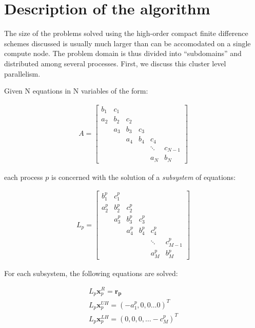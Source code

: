 \documentclass{article}
\begin{document}
\section{Description of the algorithm}

    The size of the problems solved using the high-order compact finite
    difference schemes discussed is usually much larger than can be accomodated
    on a single compute node.
    The problem domain is thus divided into ``subdomains'' and distributed among
    several processes.
    First, we discuss this cluster level parallelism.

    Given N equations in N variables of the form:

    \begin{align}
    & A =
     \begin{bmatrix}
         b_1 & c_1 \\
         a_2 & b_2 & c_2 \\
             & a_3 & b_3 & c_3 \\
             &     & a_4 & b_4 & c_4 \\
             &     &     &     &  \ddots & c_{N-1}\\
             &     &     &     &     a_N  & b_N
      \end{bmatrix}&
    \end{align}

    each process $p$ is concerned with the solution of a \emph{subsystem}
    of equations:

    \begin{align}
    &L_p =
    \begin{bmatrix}
        b_1^p & c_1^p \\
        a_2^p & b_2^p & c_2^p \\
              & a_3^p & b_3^p & c_3^p \\
              &       & a_4^p & b_4^p & c_4^p \\
              &       &       &       &  \ddots & c_{M-1}^p\\
              &       &       &       &     a_{M}^p  & b_{M}^p
     \end{bmatrix}&
    \end{align}

    For each subsystem, the following equations are solved:

    \begin{align}
        & L_p\boldsymbol{x}_p^R = \boldsymbol{r_p} &  \label{eqn:local-eqn-1} \\
        & L_p\boldsymbol{x}_p^{UH} = (-a_1^p, 0, 0 \hdots 0)^T &  \label{eqn:local-eqn-2} \\
        & L_p\boldsymbol{x}_p^{LH} = (0, 0, 0, \hdots -c_M^p)^T \label{eqn:local-eqn-3} &
    \end{align}
\end{document}
